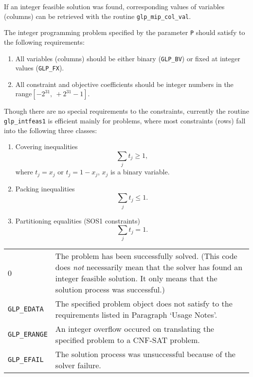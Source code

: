 \documentclass[11pt,draft]{article}
\makeatletter
\def\para#1{\noindent{\bf#1}}
\def\returns{\para{Returns}}
\newenvironment{retlist}
{  \def\arraystretch{1.5}
   \noindent
   \begin{tabular}{@{}p{1in}@{}p{5.5in}@{}}
}
{\end{tabular}}
\makeatother
\begin{document}
\newpage

If an integer feasible solution was found, corresponding values of
variables (columns) can be retrieved with the routine
\verb|glp_mip_col_val|.

\para{Usage Notes}

The integer programming problem specified by the parameter \verb|P|
should satisfy to the following requirements:

\begin{enumerate}
\item All variables (columns) should be either binary ({\tt GLP\_BV})
or fixed at integer values ({\tt GLP\_FX}).

\item All constraint and objective coefficients should be integer
numbers in the range\linebreak $[-2^{31},\ +2^{31}-1]$.
\end{enumerate}

Though there are no special requirements to the constraints,
currently the routine \verb|glp_intfeas1| is efficient mainly for
problems, where most constraints (rows) fall into the following three
classes:

\begin{enumerate}
\item Covering inequalities
$$\sum_{j}t_j\geq 1,$$
where $t_j=x_j$ or $t_j=1-x_j$, $x_j$ is a binary variable.

\item Packing inequalities
$$\sum_{j}t_j\leq 1.$$

\item Partitioning equalities (SOS1 constraints)
$$\sum_{j}t_j=1.$$
\end{enumerate}

\returns

\begin{retlist}
0 & The problem has been successfully solved. (This code does
{\it not} necessarily mean that the solver has found an integer
feasible solution. It only means that the solution process was
successful.) \\

{\tt GLP\_EDATA} & The specified problem object does not satisfy
to the requirements listed in Paragraph `Usage Notes'. \\

{\tt GLP\_ERANGE} & An integer overflow occured on translating the
specified problem to a CNF-SAT problem. \\

{\tt GLP\_EFAIL} & The solution process was unsuccessful because of
the solver failure. \\
\end{retlist}
\end{document}
